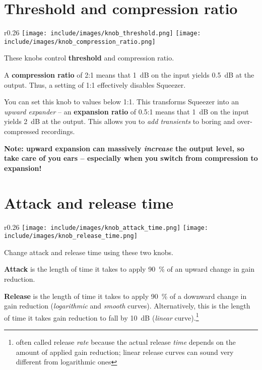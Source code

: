 \newpage %

\section{Threshold and compression ratio}

\begin{wrapfigure}{r}{0.26\linewidth}
  \texttt{[image: include/images/knob\_threshold.png]}
  \texttt{[image: include/images/knob\_compression\_ratio.png]}
\end{wrapfigure}

These knobs control \textbf{threshold} and compression ratio.

A \textbf{compression ratio} of 2:1 means that \SI{1}{\dB} on the
input yields \SI{0.5}{\dB} at the output.  Thus, a setting of 1:1
effectively disables Squeezer.

You can set this knob to values below 1:1.  This transforms Squeezer
into an \emph{upward expander} -- an \textbf{expansion ratio} of 0.5:1
means that \SI{1}{\dB} on the input yields \SI{2}{\dB} at the output.
This allows you to \emph{add transients} to boring and over-compressed
recordings.

\textbf{Note: upward expansion can massively \emph{increase} the
  output level, so take care of you ears -- especially when you switch
  from compression to expansion!}

\section{Attack and release time}

\begin{wrapfigure}{r}{0.26\linewidth}
  \texttt{[image: include/images/knob\_attack\_time.png]}
  \texttt{[image: include/images/knob\_release\_time.png]}
\end{wrapfigure}

Change attack and release time using these two knobs.

\textbf{Attack} is the length of time it takes to apply
\SI{90}{\percent} of an upward change in gain reduction.

\textbf{Release} is the length of time it takes to apply
\SI{90}{\percent} of a downward change in gain reduction
(\emph{logarithmic} and \emph{smooth} curves).  Alternatively, this is
the length of time it takes gain reduction to fall by \SI{10}{\dB}
(\emph{linear} curve).\footnote{often called release \emph{rate}
  because the actual release \emph{time} depends on the amount of
  applied gain reduction; linear release curves can sound very
  different from logarithmic ones}

